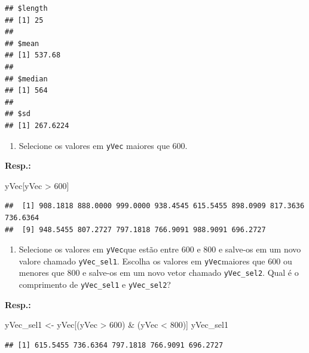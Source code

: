 \documentclass[
]{article}
\newenvironment{Shaded}{\begin{snugshade}}{\end{snugshade}}
\newcommand{\DecValTok}[1]{\textcolor[rgb]{0.00,0.00,0.81}{#1}}
\newcommand{\NormalTok}[1]{#1}
\newcommand{\OtherTok}[1]{\textcolor[rgb]{0.56,0.35,0.01}{#1}}
\newcommand{\SpecialCharTok}[1]{\textcolor[rgb]{0.00,0.00,0.00}{#1}}
\providecommand{\tightlist}{%
  \setlength{\itemsep}{0pt}\setlength{\parskip}{0pt}}
\begin{document}
\begin{verbatim}
## $length
## [1] 25
## 
## $mean
## [1] 537.68
## 
## $median
## [1] 564
## 
## $sd
## [1] 267.6224
\end{verbatim}

\begin{enumerate}
\def\labelenumi{\arabic{enumi}.}
\setcounter{enumi}{3}
\tightlist
\item
  Selecione os valores em \texttt{yVec} maiores que 600.
\end{enumerate}

\textbf{Resp.:}

\begin{Shaded}
\begin{Highlighting}[]
\NormalTok{yVec[yVec }\SpecialCharTok{\textgreater{}} \DecValTok{600}\NormalTok{]}
\end{Highlighting}
\end{Shaded}

\begin{verbatim}
##  [1] 908.1818 888.0000 999.0000 938.4545 615.5455 898.0909 817.3636 736.6364
##  [9] 948.5455 807.2727 797.1818 766.9091 988.9091 696.2727
\end{verbatim}

\begin{enumerate}
\def\labelenumi{\arabic{enumi}.}
\setcounter{enumi}{4}
\tightlist
\item
  Selecione os valores em \texttt{yVec}que estão entre 600 e 800 e salve-os em um novo valore chamado \texttt{yVec\_sel1}. Escolha os valores em \texttt{yVec}maiores que 600 ou menores que 800 e salve-os em um novo vetor chamado \texttt{yVec\_sel2}. Qual é o comprimento de \texttt{yVec\_sel1} e \texttt{yVec\_sel2}?
\end{enumerate}

\textbf{Resp.:}

\begin{Shaded}
\begin{Highlighting}[]
\NormalTok{yVec\_sel1 }\OtherTok{\textless{}{-}}\NormalTok{ yVec[(yVec }\SpecialCharTok{\textgreater{}} \DecValTok{600}\NormalTok{) }\SpecialCharTok{\&}\NormalTok{ (yVec }\SpecialCharTok{\textless{}} \DecValTok{800}\NormalTok{)]}
\NormalTok{yVec\_sel1}
\end{Highlighting}
\end{Shaded}

\begin{verbatim}
## [1] 615.5455 736.6364 797.1818 766.9091 696.2727
\end{verbatim}
\end{document}
